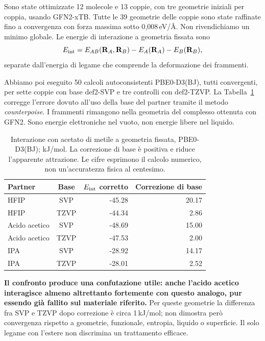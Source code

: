 \documentclass[11pt,reqno]{amsart}
\numberwithin{equation}{section}
\begin{document}
Sono state ottimizzate 12 molecole e 13 coppie, con tre geometrie iniziali
per coppia, usando GFN2-xTB. Tutte le 39 geometrie delle coppie sono state
raffinate fino a convergenza con forza massima sotto
0,008\,eV/\AA. Non rivendichiamo un minimo globale.
Le energie di interazione a geometria fissata sono
\begin{equation}
 E_{\rm int}=E_{AB}(\mathbf R_A,\mathbf R_B)
             -E_A(\mathbf R_A)-E_B(\mathbf R_B),
\end{equation}
separate dall'energia di legame che comprende la deformazione dei frammenti.

Abbiamo poi eseguito 50 calcoli autoconsistenti PBE0-D3(BJ), tutti
convergenti, per sette coppie con base def2-SVP e tre controlli con
def2-TZVP. La Tabella~\ref{tab:quantum} corregge l'errore dovuto
all'uso della base del partner tramite il metodo \emph{counterpoise}.
I frammenti rimangono nella geometria del complesso ottenuta con GFN2.
Sono energie elettroniche nel vuoto, non energie libere nel liquido.

\begin{table}[htbp]\centering
\caption{Interazione con acetato di metile a geometria fissata,
PBE0-D3(BJ); kJ/mol. La correzione di base \`e positiva e riduce
l'apparente attrazione. Le cifre esprimono il calcolo numerico,
non un'accuratezza fisica al centesimo.}\label{tab:quantum}
\small
\begin{tabular}{lcrr}\toprule
Partner & Base & $E_{\rm int}$ corretto & Correzione di base\\\midrule
HFIP & SVP & -45.28 & 20.17 \\
HFIP & TZVP & -44.34 & 2.86 \\
Acido acetico & SVP & -48.69 & 15.00 \\
Acido acetico & TZVP & -47.53 & 2.00 \\
IPA & SVP & -28.92 & 14.17 \\
IPA & TZVP & -28.01 & 2.52 \\
\bottomrule\end{tabular}
\end{table}

\textbf{Il confronto produce una confutazione utile: anche l'acido
acetico interagisce almeno altrettanto fortemente con questo analogo,
pur essendo gi\`a fallito sul materiale riferito.} Per queste geometrie
la differenza fra SVP e TZVP dopo correzione \`e circa 1\,kJ/mol;
non dimostra per\`o convergenza rispetto a geometrie, funzionale,
entropia, liquido o superficie. Il solo legame con l'estere non
discrimina un trattamento efficace.
\end{document}
